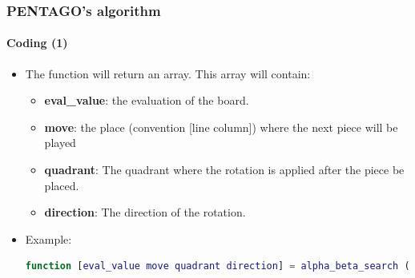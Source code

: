 \documentclass[10pt]{beamer}
\begin{document}
\begin{frame}[fragile]

\frametitle{PENTAGO's algorithm}
\framesubtitle{Coding (1)}

\begin{itemize}
  	\item The function will return an array. This array will contain:
	
	\begin{itemize}
	  
		\item \textbf{eval\_value}: the evaluation of the board.
		\item \textbf{move}: the place (convention [line column]) where the next piece
		will be played
		\item \textbf{quadrant}: The quadrant where the rotation is applied after the
		piece be placed.

		\item \textbf{direction}: The direction of the rotation.

	\end{itemize}
	\item Example:
\begin{lstlisting}[language=Matlab]
function [eval_value move quadrant direction] = alpha_beta_search (state_matrix, emptySlots, depth, alpha, beta, isMaximizing, player)
\end{lstlisting}
\end{itemize}

\end{frame}
\end{document}
